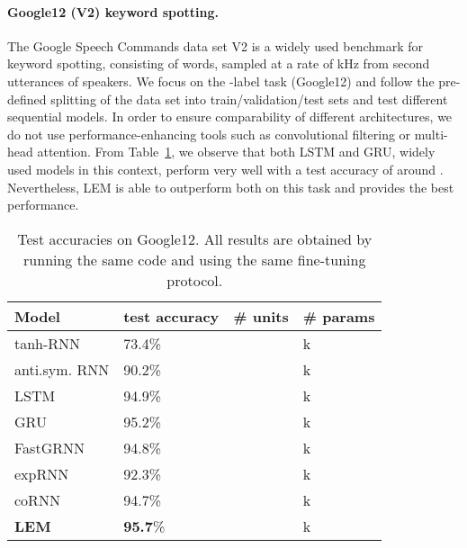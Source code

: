 \documentclass{article} \usepackage{iclr2022_conference,times}
\newcommand{\Tref}[1]{Table~\ref{#1}}
\begin{document}
\paragraph{Google12 (V2) keyword spotting.}
The Google Speech Commands data set V2 \citep{google12} is a widely used benchmark for keyword spotting, consisting of  words, sampled at a rate of  kHz from  second utterances of  speakers. We focus on the -label task (Google12) and follow the pre-defined splitting of the data set into train/validation/test sets and test different sequential models. In order to ensure comparability of different architectures, we do not use performance-enhancing tools such as convolutional filtering or multi-head attention. From \Tref{tab:google12}, we observe that both LSTM and GRU, widely used models in this context, perform very well with a test accuracy of around . Nevertheless, LEM is able to outperform both on this task and provides the best performance. 
\begin{table}[ht!]
  \caption{Test accuracies on Google12. All results are obtained by running the same code and using the same fine-tuning protocol.}
  \label{tab:google12}
  \centering
  \begin{tabular}{llll}
    \toprule
    \cmidrule(r){1-4}
    { Model} &  test accuracy & \# units & \# params \\
    \midrule
tanh-RNN & 73.4\% &  & k\\
anti.sym. RNN & 90.2\% &  & k\\
LSTM  & 94.9\% &  & k\\
GRU  & 95.2\% &  & k  \\
FastGRNN  & 94.8\%&  & k \\
expRNN & 92.3\% &  & k \\
coRNN  &94.7\% &  & k \\
\textbf{LEM}  & \textbf{95.7}\% &  & k \\
\bottomrule
\end{tabular}
\end{table}
\end{document}
